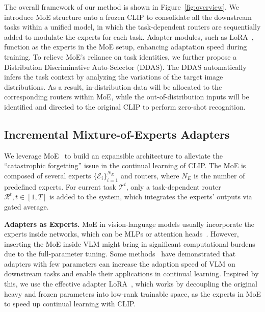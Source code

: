 The overall framework of our method is shown in Figure~\ref{fig:overview}. We introduce MoE structure onto a frozen CLIP to consolidate all the downstream tasks within a unified model, in which the task-dependent routers are sequentially added to modulate the experts for each task. Adapter modules, such as LoRA~\cite{hu2021lora}, function as the experts in the MoE setup, enhancing adaptation speed during training. To relieve MoE's reliance  on task identities, we further propose a Distribution Discriminative Auto-Selector (DDAS). The DDAS automatically infers the task context by analyzing the variations of the target image distributions.  As a result, in-distribution data will be allocated to the corresponding routers within MoE, while the out-of-distribution inputs will be identified and directed  to the original CLIP to perform zero-shot recognition.    


\subsection{Incremental Mixture-of-Experts Adapters}
\label{MoEs}
%

We leverage MoE~\cite{shazeer2017outrageously} to build an expansible architecture to alleviate the ``catastrophic forgetting'' issue in the continual learning of CLIP. The MoE is composed of several experts $\{\mathcal{E}_i\}_{i=1}^{N_E}$ and routers, where $N_E$ is the number of predefined experts. For current task $\mathcal{T}^t$, only a task-dependent router $\mathcal{R}^t, t\in[1,T]$ is added to the system, which integrates the experts' outputs via gated average. 



\vspace{1ex}
\noindent\textbf{Adapters as Experts.} 
MoE in vision-language models usually incorporate the experts inside networks, which can be MLPs or attention heads~\cite{shazeer2017outrageously, zhang2022mixture, chen2023mod}. However, inserting the MoE inside VLM might bring in significant computational burdens due to the full-parameter tuning. Some methods~\cite{gao2023clip, liu2023class} have demonstrated that adapters with few parameters can increase the adaption speed of VLM on downstream tasks and enable their applications in continual learning. 
%
Inspired by this, we use the effective adapter LoRA~\cite{hu2021lora}, which works by decoupling the original heavy and frozen parameters into low-rank trainable space, as the experts in MoE to speed up continual learning with CLIP. 
%

